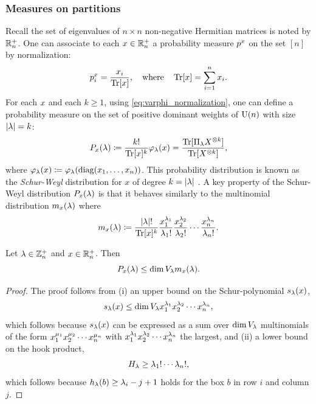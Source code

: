 \documentclass[notitlepage, 11pt, letterpaper]{amsart}
\begin{document}
\subsubsection{Measures on partitions}

Recall the set of eigenvalues of $n\times n$ non-negative Hermitian matrices is noted by $\mathbb R^{+}_{n}$.
One can associate to each $x \in \mathbb R^{+}_{n}$ a probability measure $p^x$ on the set $[n]$ by normalization:
\begin{equation}
    p^x_i = \frac{x_i}{\operatorname{Tr}[x]}, \quad \text{where} \quad \operatorname{Tr}[x] = \sum_{i=1}^n x_i.
\end{equation}
For each $x$ and each $k \geq 1$, using \cref{eq:varphi_normalization}, one can define a probability measure on the set of positive dominant weights of $\operatorname{U}(n)$ with size $|\lambda| = k$:
\begin{equation}
    \label{eq:schur_weyl_dist}
    P_{x}(\lambda) \coloneqq \frac{k!}{\operatorname{Tr}[x]^k} \varphi_\lambda(x) = \frac{\operatorname{Tr}[\Pi_{\lambda} X^{\otimes k}]}{\operatorname{Tr}[X^{\otimes k}]},
\end{equation}
where $\varphi_\lambda(x) \coloneqq \varphi_{\lambda}(\operatorname{diag}(x_1, \ldots, x_n))$.
This probability distribution is known as the \textit{Schur-Weyl} distribution for $x$ of degree $k = |\lambda|$ \cite{odonnell2016efficient}.
A key property of the Schur-Weyl distribution $P_{x}(\lambda)$ is that it behaves similarly to the multinomial distribution $m_{x}(\lambda)$ where
\begin{equation}
    m_{x}(\lambda) \coloneqq \frac{|\lambda|!}{\operatorname{Tr}[x]^{k}}\frac{x_1^{\lambda_1}}{\lambda_1!}\frac{x_2^{\lambda_2}}{\lambda_2!} \cdots \frac{x_n^{\lambda_n}}{\lambda_n!}.
\end{equation}
\begin{prop}
    \label{prop:multinomial_bound}
    Let $\lambda \in \mathbb Z^{+}_{n}$ and $x \in \mathbb R^{+}_{n}$.
    Then
    \begin{equation}
        P_{x}(\lambda) \leq \dim V_{\lambda} m_{x}(\lambda).
    \end{equation}
\end{prop}
\begin{proof}
    The proof follows from (i) an upper bound on the Schur-polynomial $s_{\lambda}(x)$,
    \begin{equation}
        s_{\lambda}(x) \leq \dim V_{\lambda} x_1^{\lambda_1}x_2^{\lambda_2}\cdots x_n^{\lambda_n},
    \end{equation}
    which follows because $s_{\lambda}(x)$ can be expressed as a sum over $\dim V_{\lambda}$ multinomials of the form $x_1^{\mu_1}x_2^{\mu_2}\cdots x_n^{\mu_n}$ with $x_1^{\lambda_1}x_2^{\lambda_2}\cdots x_n^{\lambda_n}$ the largest, and (ii) a lower bound on the hook product,
    \begin{equation}
        H_{\lambda} \geq \lambda_1!\cdots \lambda_n!,
    \end{equation}
    which follows because $h_{\lambda}(b) \geq \lambda_i - j + 1$ holds for the box $b$ in row $i$ and column $j$.
\end{proof}
\end{document}

